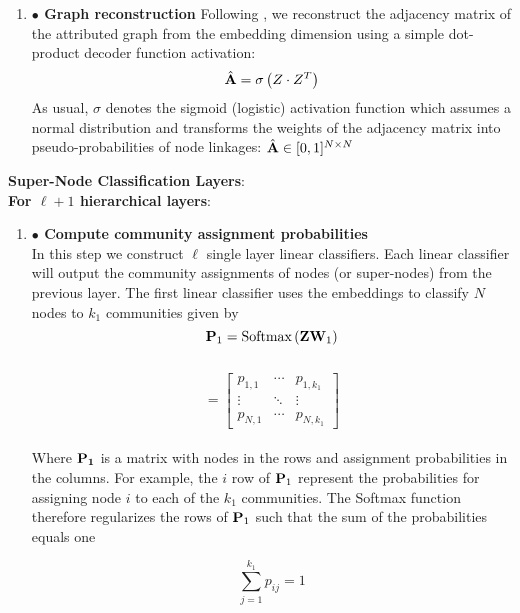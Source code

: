 \documentclass[a4paper,12pt]{article}
\newcommand{\forceindent}{\leavevmode{\parindent=2em\indent}}
\begin{document}
\begin{itemize}
\begin{enumerate}
{\begin{enumerate}
{					\[\hat{\bf X} = {\bf \hat{H}}_m = \sigma\left({\bf \hat{W}}_{m}\cdot {\bf \hat{H}}_{m-1}\right)\cdot {\bf \hat{\Theta}}^{(m)}\]
				}\\
				
				\item[]{\textbf{$\bullet$ Graph reconstruction} 
					Following \cite{kipf2016semi, salehi2019graph, zhou2023community}, we reconstruct the adjacency matrix of the attributed graph from the embedding dimension using a simple dot-product decoder function activation: 
					\[\hat{\bf A} = \sigma\left(Z\cdot Z^T\right) \]
					As usual, $\sigma$ denotes the sigmoid (logistic) activation function which assumes a normal distribution and transforms the weights of the adjacency matrix into pseudo-probabilities of node linkages: $\hat{\bf A} \in [0,1]^{N\times N}$
				}\\
					
			\end{enumerate}
			\forceindent \textbf{Super-Node Classification Layers}: \\
			\forceindent \textbf{For $\ell+1$ hierarchical layers}:
			\begin{enumerate}
				\item[]{\textbf{$\bullet$ Compute community assignment probabilities} 
					\\
					In this step we construct $\ell$ single layer linear classifiers. Each linear classifier will output the community assignments of nodes (or super-nodes) from the previous layer. The first linear classifier uses the embeddings to classify $N$ nodes to $k_1$ communities given by
					\[{\bf P}_{1} = \text{Softmax}\left({\bf Z}{\bf W}_{1}\right) \]
					\\ 
					\[= \begin{bmatrix}
						p_{1, 1} & \cdots & p_{1, k_1} \\
						\vdots  & \ddots & \vdots \\
						p_{N, 1} & \cdots & p_{N, k_1} 
					\end{bmatrix}\]}\\
				
					Where $\bf P_1$ is a matrix with nodes in the rows and assignment probabilities in the columns. For example, the $i$ row of ${\bf P}_1$ represent the probabilities for assigning  node $i$ to each of the $k_1$ communities. The Softmax function therefore regularizes the rows of ${\bf P}_1$ such that the sum of the probabilities equals one 
					
					\[ \sum_{j = 1}^{k_1} p_{ij} = 1\]
					

\end{enumerate}}
\end{enumerate}
\end{itemize}
\end{document}
